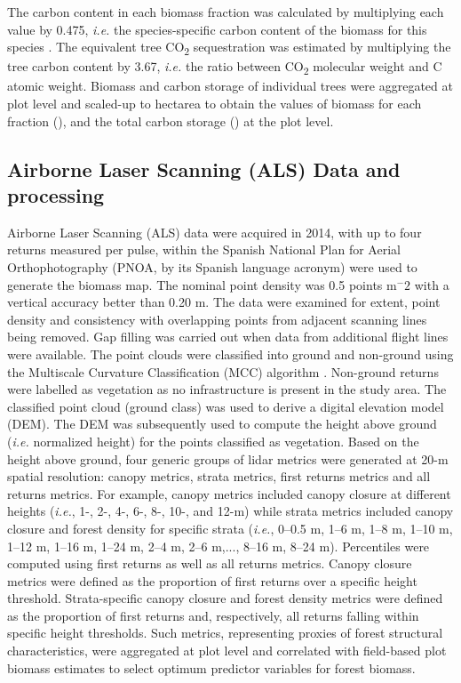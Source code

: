 The carbon content in each biomass fraction was calculated by multiplying each value by 0.475, \emph{i.e.} the species-specific carbon content of the biomass for this species  \autocite{Ibanezetal2002MetodologiaComplementaria,Monteroetal2005ProduccionBiomasa}. The equivalent tree CO\textsubscript{2} sequestration was estimated by multiplying the tree carbon content by 3.67, \emph{i.e.} the ratio between CO\textsubscript{2} molecular weight and C atomic weight. Biomass and carbon storage of individual trees were aggregated at plot level and  scaled-up to hectarea to obtain the values of biomass for each fraction (\mgha), and the total carbon storage (\mgha) at the plot level.

\subsection{Airborne Laser Scanning (ALS) Data and processing}\label{sec:carbon:mat-lidar}
Airborne Laser Scanning (ALS) data were acquired in 2014, with up to four returns measured per pulse, within the Spanish National Plan for Aerial Orthophotography (PNOA, by its Spanish language acronym) were used to generate the biomass map. The nominal point density was 0.5 points m$^-2$ with a vertical accuracy better than 0.20 m. 
The data were examined for extent, point density and consistency with overlapping points from adjacent scanning lines being removed. Gap filling was carried out when data from additional flight lines were available. The point clouds were classified into ground and non-ground using the Multiscale Curvature Classification (MCC) algorithm \autocite{EvansHudak2007MultiscaleCurvature}. Non-ground returns were labelled as vegetation as no infrastructure is present in the study area. The classified point cloud (ground class) was used to derive a digital elevation model (DEM). The DEM was subsequently used to compute the height above ground (\emph{i.e.} normalized height) for the points classified as vegetation. Based on the height above ground, four generic groups of lidar metrics were generated at 20-m spatial resolution: canopy metrics, strata metrics, first returns metrics and all returns metrics. For example, canopy metrics included canopy closure at different heights (\emph{i.e.}, 1-, 2-, 4-, 6-, 8-, 10-, and 12-m) while strata metrics included canopy closure and forest density for specific strata (\emph{i.e.}, 0–0.5 m, 1–6 m, 1–8 m, 1–10 m, 1–12 m, 1–16 m, 1–24 m, 2–4 m, 2–6 m,..., 8–16 m, 8–24 m). Percentiles were computed using first returns as well as all returns metrics. Canopy closure metrics were defined as the proportion of first returns over a specific height threshold. Strata-specific canopy closure and forest density metrics were defined as the proportion of first returns and, respectively, all returns falling within specific height thresholds. Such metrics, representing proxies of forest structural characteristics, were aggregated at plot level and correlated with field-based plot biomass estimates to select optimum predictor variables for forest biomass.
